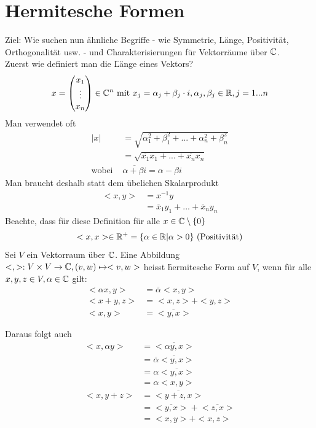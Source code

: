 \section{Hermitesche Formen} %
\f{Ziel}: Wie suchen nun ähnliche Begriffe - wie Symmetrie, Länge, Positivität, Orthogonalität usw. - und Charakterisierungen für Vektorräume über $\mathbb{C}$. \\
Zuerst wie definiert man die \f{Länge} eines Vektors?
\begin{align}
x = \begin{pmatrix} x_1 \\ \vdots \\ x_n \end{pmatrix} \in \mathbb{C}^n \text{ mit } x_j = \alpha_j + \beta_j\cdot i, \alpha_j, \beta_j \in \mathbb{R}, j = 1...n
\end{align}
Man verwendet oft 
\begin{align}
|x| &= \sqrt{\alpha_1^2 + \beta_1^2 + ... + \alpha_n^2 + \beta_n^2} \\
&= \sqrt{\overline{x_1}x_1 + ... + \overline{x_n} x_n} \\
\text{wobei } &\overline{\alpha + \beta i} = \alpha - \beta i
\end{align}
Man braucht deshalb statt dem übelichen Skalarprodukt
\begin{align}
<x, y> &= x^{-1} y \\
&= \overline{x}_1 y_1 + ... + \overline{x}_n y_n
\end{align}
Beachte, dass für diese Definition für alle $x \in \mathbb{C}\setminus \{0\}$
\begin{align}
<x, x> \in \mathbb{R}^{+} = \{\alpha \in \mathbb{R} | \alpha > 0\} \text{ (Positivität)}
\end{align}
Sei $V$ ein Vektorraum über $\mathbb{C}$. Eine Abbildung $<, >: V \times V \rightarrow \mathbb{C}, (v, w) \mapsto <v, w>$ heisst \f{hermitesche Form} auf $V$, wenn für alle $x, y, z \in V, \alpha \in \mathbb{C}$ gilt:
\begin{align}
<\alpha x, y> &= \overline{\alpha} <x, y> \\
<x+y, z> &= <x, z> + <y, z> \\
<x, y> &= \overline{<y, x>}
\end{align}

Daraus folgt auch
\begin{align}
<x, \alpha y> &= \overline{<\alpha y, x>} \\
&= \overline{\overline{\alpha}<y, x>} \\
&= \alpha \overline{<y, x>} \\
&= \alpha <x, y> \\
<x, y+z> &= \overline{<y+z, x>} \\
&= \overline{<y, x>} + \overline{<z, x>}\\
&= <x, y> + <x, z>
\end{align}

